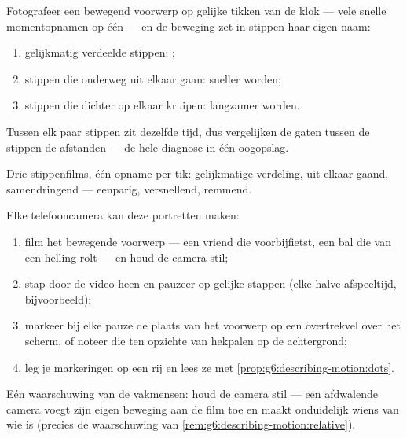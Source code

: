 \begin{proposition}\label{prop:g6:describing-motion:dots}
Fotografeer een bewegend voorwerp op gelijke tikken van de klok ---
vele snelle momentopnamen op één  --- en de beweging zet in
stippen haar eigen naam:
\begin{enumerate}
  \item gelijkmatig verdeelde stippen: ;
  \item stippen die onderweg uit elkaar gaan: sneller worden;
  \item stippen die dichter op elkaar kruipen: langzamer worden.
\end{enumerate}
Tussen elk paar stippen zit dezelfde tijd, dus vergelijken de gaten
tussen de stippen de afstanden --- de hele diagnose in één oogopslag.
\end{proposition}

\begin{omfigure}

{\small Drie stippenfilms, één opname per tik: gelijkmatige verdeling,
uit elkaar gaand, samendringend --- eenparig, versnellend, remmend.}
\end{omfigure}

\begin{method}\label{met:g6:describing-motion:film}
Elke telefooncamera kan deze portretten maken:
\begin{enumerate}
  \item film het bewegende voorwerp --- een vriend die voorbijfietst,
        een bal die van een helling rolt --- en houd de camera stil;
  \item stap door de video heen en pauzeer op gelijke stappen (elke
        halve  afspeeltijd, bijvoorbeeld);
  \item markeer bij elke pauze de plaats van het voorwerp op een
        overtrekvel over het scherm, of noteer die ten opzichte van
        hekpalen op de achtergrond;
  \item leg je markeringen op een rij en lees ze met
        \cref{prop:g6:describing-motion:dots}.
\end{enumerate}
Eén waarschuwing van de vakmensen: houd de camera stil --- een
afdwalende camera voegt zijn eigen beweging aan de film toe en maakt
onduidelijk wiens  van wie is (precies de waarschuwing van
\cref{rem:g6:describing-motion:relative}).
\end{method}

